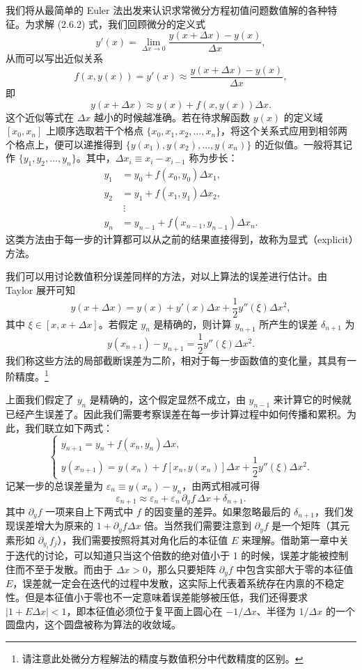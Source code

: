 我们将从最简单的 Euler 法出发来认识求常微分方程初值问题数值解的各种特征。为求解 (2.6.2) 式，我们回顾微分的定义式
\begin{equation}
y'(x)=\lim_{\Delta x\to0}\frac{y(x+\Delta x)-y(x)}{\Delta x},
\tag{2.6.4}
\end{equation}
从而可以写出近似关系
\begin{equation}
f(x,y(x))=y'(x)\approx \frac{y(x+\Delta x)-y(x)}{\Delta x},
\tag{2.6.5}
\end{equation}
即
\[
y(x+\Delta x)\approx y(x)+f(x,y(x))\Delta x.
\]
这个近似等式在 $\Delta x$ 越小的时候越准确。若在待求解函数 $y(x)$ 的定义域 $[x_0,x_n]$ 上顺序选取若干个格点 $\{x_0,x_1,x_2,\ldots,x_n\}$，将这个关系式应用到相邻两个格点上，便可以递推得到 $\{y(x_1),y(x_2),\ldots,y(x_n)\}$ 的近似值。一般将其记作 $\{y_1,y_2,\ldots,y_n\}$。其中，$\Delta x_i\equiv x_i-x_{i-1}$ 称为步长：
\begin{equation}
\begin{aligned}
y_1&=y_0+f(x_0,y_0)\Delta x_1,\\
y_2&=y_1+f(x_1,y_1)\Delta x_2,\\
&\ \vdots\\
y_n&=y_{n-1}+f(x_{n-1},y_{n-1})\Delta x_n.
\end{aligned}
\tag{2.6.6}
\end{equation}
这类方法由于每一步的计算都可以从之前的结果直接得到，故称为显式（explicit）方法。

我们可以用讨论数值积分误差同样的方法，对以上算法的误差进行估计。由 Taylor 展开可知
\[
y(x+\Delta x)=y(x)+y'(x)\Delta x+\frac12y''(\xi)\Delta x^2,
\]
其中 $\xi\in[x,x+\Delta x]$。若假定 $y_n$ 是精确的，则计算 $y_{n+1}$ 所产生的误差 $\delta_{n+1}$ 为
\[
y(x_{n+1})-y_{n+1}=\frac12y''(\xi)\Delta x^2.
\]
我们称这些方法的局部截断误差为二阶，相对于每一步函数值的变化量，其具有一阶精度。\footnote{请注意此处微分方程解法的精度与数值积分中代数精度的区别。}

上面我们假定了 $y_n$ 是精确的，这个假定显然不成立，由 $y_{n-1}$ 来计算它的时候就已经产生误差了。因此我们需要考察误差在每一步计算过程中如何传播和累积。为此，我们联立如下两式：
\[
\begin{cases}
y_{n+1}=y_n+f(x_n,y_n)\Delta x,\\
y(x_{n+1})=y(x_n)+f[x_n,y(x_n)]\Delta x+\dfrac12y''(\xi)\Delta x^2.
\end{cases}
\]
记某一步的总误差量为 $\varepsilon_n\equiv y(x_n)-y_n$，由两式相减可得
\[
\varepsilon_{n+1}\approx \varepsilon_n+\varepsilon_n\,\partial_yf\,\Delta x+\delta_{n+1}.
\]
其中 $\partial_yf$ 一项来自上下两式中 $f$ 的因变量的差异。如果忽略最后的 $\delta_{n+1}$，我们发现误差增大为原来的 $1+\partial_yf\Delta x$ 倍。当然我们需要注意到 $\partial_yf$ 是一个矩阵（其元素形如 $\partial_{y_i}f_j$），我们需要按照将其对角化后的本征值 $E$ 来理解。借助第一章中关于迭代的讨论，可以知道只当这个倍数的绝对值小于 1 的时候，误差才能被控制住而不至于发散。而由于 $\Delta x>0$，那么只要矩阵 $\partial_yf$ 中包含实部大于零的本征值 $E$，误差就一定会在迭代的过程中发散，这实际上代表着系统存在内禀的不稳定性。但是本征值小于零也不一定意味着误差能够被压低，我们还得要求 $|1+E\Delta x|<1$，即本征值必须位于复平面上圆心在 $-1/\Delta x$、半径为 $1/\Delta x$ 的一个圆盘内，这个圆盘被称为算法的收敛域。

